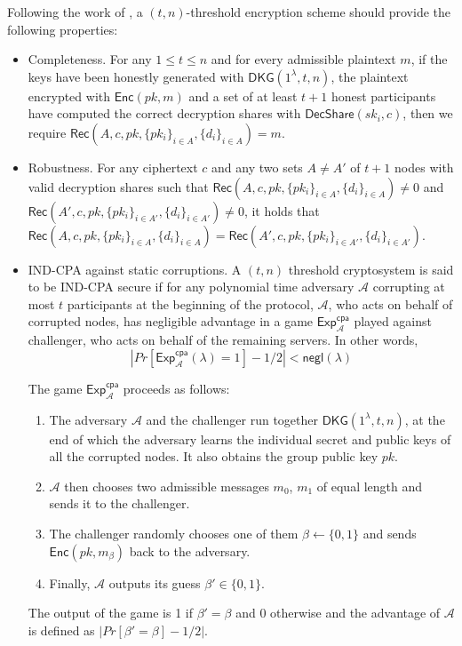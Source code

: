 \documentclass[letterpaper,twocolumn,10pt]{article}
\theoremstyle{definition}
\theoremstyle{remark}
\begin{document}
    Following the work of \cite{cortier2013distributed}, a $(t, n)$-threshold encryption scheme should provide the following properties:
    \begin{itemize}
        \item Completeness. For any $1 \le t \le n$ and for every admissible plaintext $m$, if the keys have been honestly generated with $\mathsf{DKG}(1^\lambda, t, n)$, the plaintext encrypted with $\mathsf{Enc}(pk, m)$ and a set of at least $t + 1$ honest participants have computed the correct decryption shares with $\mathsf{DecShare}(sk_i, c)$, then we require $\mathsf{Rec}(A, c, pk, \{pk_i\}_{i \in A}, \{d_i\}_{i \in A}) = m$.
        \item Robustness. For any ciphertext $c$ and any two sets $A \neq A'$ of $t + 1$ nodes with valid decryption shares such that $\mathsf{Rec}(A, c, pk, \{pk_i\}_{i \in A}, \{d_i\}_{i \in A}) \neq 0$ and $\mathsf{Rec}(A', c, pk, \{pk_i\}_{i \in A'}, \{d_i\}_{i \in A'}) \neq 0$, it holds that $\mathsf{Rec}(A, c, pk, \{pk_i\}_{i \in A}, \{d_i\}_{i \in A}) = \mathsf{Rec}(A', c, pk, \{pk_i\}_{i \in A'}, \{d_i\}_{i \in A'})$.
        \item IND-CPA against static corruptions. A $(t, n)$ threshold cryptosystem is said to be IND-CPA secure if for any polynomial time adversary $\mathcal{A}$ corrupting at most $t$ participants at the beginning of the protocol, $\mathcal{A}$, who acts on behalf of corrupted nodes, has negligible advantage in a game $\mathsf{Exp}^{\mathsf{cpa}}_{\mathcal{A}}$ played against challenger, who acts on behalf of the remaining servers. In other words,
        $$|Pr[\mathsf{Exp}_{\mathcal{A}}^{\mathsf{cpa}}(\lambda) = 1] - 1/2| < \mathsf{negl}(\lambda)$$
        
        The game $\mathsf{Exp}^{\mathsf{cpa}}_{\mathcal{A}}$ proceeds as follows:
        \begin{enumerate}
            \item The adversary $\mathcal{A}$ and the challenger run together $\mathsf{DKG}(1^\lambda, t, n)$, at the end of which the adversary learns the individual secret and public keys of all the corrupted nodes. It also obtains the group public key $pk$.
            \item $\mathcal{A}$ then chooses two admissible messages $m_0$, $m_1$ of equal length and sends it to the challenger.
            \item The challenger randomly chooses one of them $\beta \leftarrow \{0, 1\}$ and sends $\mathsf{Enc}(pk, m_{\beta})$ back to the adversary.
            \item Finally, $\mathcal{A}$ outputs its guess $\beta' \in \{0,1\}$.
        \end{enumerate}
        The output of the game is 1 if $\beta' = \beta$ and 0 otherwise and the advantage of $\mathcal{A}$ is defined as $|Pr[\beta' = \beta] - 1/2|$.
    \end{itemize}
\fi
\end{document}
